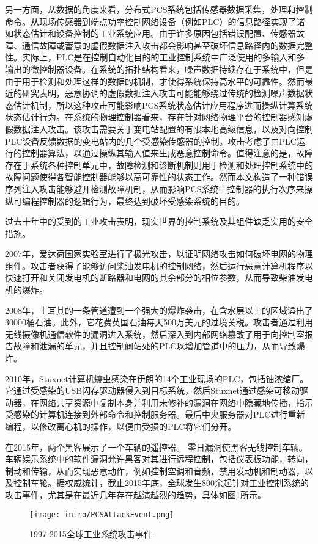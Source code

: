 另一方面，从数据的角度来看，分布式PCS系统包括传感器数据采集，处理和控制命令。从现场传感器到端点功率控制网络设备（例如PLC）的信息路径实现了诸如状态估计和设备控制的工业系统应用。由于许多原因包括错误配置、传感器故障、通信故障或蓄意的虚假数据注入攻击都会影响甚至破坏信息路径内的数据完整性。实际上，PLC是在控制自动化目的的工业控制系统中广泛使用的多输入和多输出的微控制器设备。在系统的拓扑结构看来，噪声数据持续存在于系统中，但是由于用于检测和处理这样的数据的机制，才使得系统保持高水平的可靠性。然而最近的研究\parencite{Liu11,Zonouz12}表明，恶意协调的虚假数据注入攻击可能能够绕过传统的检测噪声数据状态估计机制，所以这种攻击可能影响PCS系统状态估计应用程序进而操纵计算系统状态估计行为\parencite{Liu092,Teixeira12,Xie11}。在系统的物理控制器看来，存在针对网络物理平台的控制器感知虚假数据注入攻击。该攻击需要关于变电站配置的有限本地高级信息，以及对向控制PLC设备反馈数据的变电站内的几个受感染传感器的控制。攻击考虑了由PLC运行的控制器算法，以通过操纵其输入值来生成恶意控制命令。值得注意的是，故障存在于系统各种控制单元中，故障检测和诊断机制则用于检测和处理控制系统中的故障问题使得各智能控制器能够以高可靠性的状态工作。然而本文构造了一种错误序列注入攻击能够避开检测故障机制，从而影响PCS系统中控制器的执行次序来操纵可编程控制器的逻辑行为，最终达到破坏受感染系统的目的。

过去十年中的受到的工业攻击表明，现实世界的控制系统及其组件缺乏实用的安全措施。

2007年，爱达荷国家实验室进行了极光攻击，以证明网络攻击如何破坏电网的物理组件\parencite{Meserve072}。攻击者获得了能够访问柴油发电机的控制网络，然后运行恶意计算机程序以快速打开和关闭发电机的断路器和电网的其余部分的相位参数，从而导致柴油发电机的爆炸。

2008年，土耳其的一条管道遭到一个强大的爆炸袭击，在含水层以上的区域溢出了30000桶石油。此外，它花费英国石油每天500万美元的过境关税。攻击者通过利用无线摄像机通信软件的漏洞进入系统，然后深入到内部网络篡改了用于向控制室报告故障和泄漏的单元，并且控制阀站处的PLC以增加管道中的压力，从而导致爆炸。

2010年，Stuxnet计算机蠕虫感染在伊朗的14个工业现场的PLC，包括铀浓缩厂\parencite{Kushner07,Chen11}。它通过受感染的USB闪存驱动器侵入到目标系统，然后Stuxnet通过感染可移动驱动器，在网络共享资源中复制本身并利用未修补的漏洞在网络中隐藏地传播，指示受感染的计算机连接到外部命令和控制服务器。最后中央服务器对PLC进行重新编程，以修改离心机的操作，以便由受损的PLC将它们分开\parencite{Line14}。

在2015年，两个黑客展示了一个车辆的遥控器\parencite{Miller15}。 零日漏洞使黑客无线控制车辆。车辆娱乐系统中的软件漏洞允许黑客对其进行远程控制，包括仪表板功能，转向，制动和传输，从而实现恶意动作，例如控制空调和音频，禁用发动机和制动器，以及控制车轮\parencite{Thomas15}。据权威统计，截止2015年底，全球发生800余起针对工业控制系统的攻击事件，尤其是在最近几年存在越演越烈的趋势，具体如图\ref{pcsattack}所示。
\begin{figure}[!htp]
 \centering
 \texttt{[image: intro/PCSAttackEvent.png]}
 \caption{1997-2015全球工业系统攻击事件.}
 \label{pcsattack}
\end{figure}


